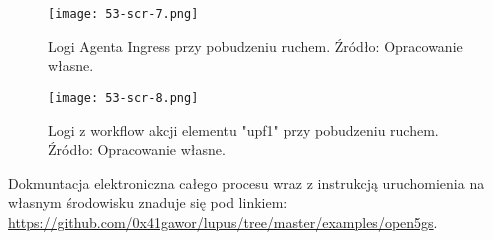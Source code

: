 \begin{figure}[!h]
    \centering \texttt{[image: 53-scr-7.png]}
    \caption{Logi Agenta Ingress przy pobudzeniu ruchem. Źródło: Opracowanie własne.}\label{fig:53-scr-7}
\end{figure}

\begin{figure}[!h]
    \centering \texttt{[image: 53-scr-8.png]}
    \caption{Logi z workflow akcji elementu "upf1" przy pobudzeniu ruchem. Źródło: Opracowanie własne.}\label{fig:53-scr-8}
\end{figure}

Dokmuntacja elektroniczna całego procesu wraz z instrukcją uruchomienia na własnym środowisku znaduje się pod linkiem: \url{https://github.com/0x41gawor/lupus/tree/master/examples/open5gs}.
